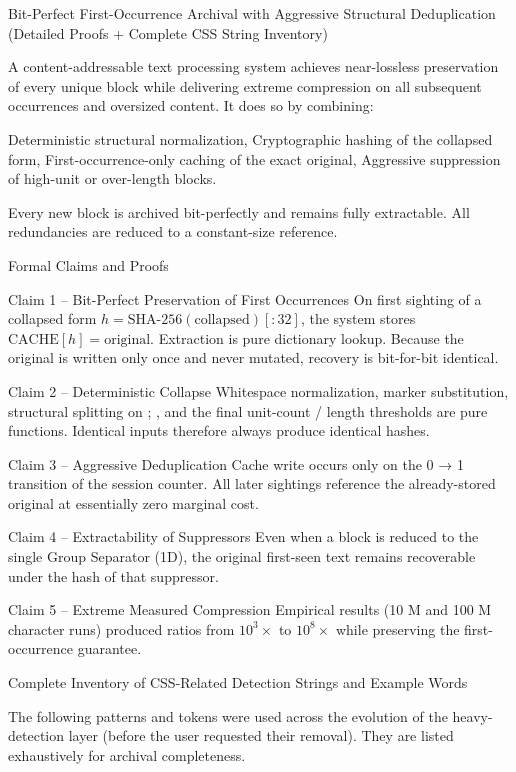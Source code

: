 Bit-Perfect First-Occurrence Archival with Aggressive Structural Deduplication  
(Detailed Proofs + Complete CSS String Inventory)

A content-addressable text processing system achieves near-lossless preservation of every unique block while delivering extreme compression on all subsequent occurrences and oversized content. It does so by combining:

Deterministic structural normalization,
Cryptographic hashing of the collapsed form,
First-occurrence-only caching of the exact original,
Aggressive suppression of high-unit or over-length blocks.

Every new block is archived bit-perfectly and remains fully extractable. All redundancies are reduced to a constant-size reference.

Formal Claims and Proofs

Claim 1 – Bit-Perfect Preservation of First Occurrences  
On first sighting of a collapsed form \( h = \text{SHA-256}(\text{collapsed})[:32] \), the system stores \(\text{CACHE}[h] = \text{original}\).  
Extraction is pure dictionary lookup. Because the original is written only once and never mutated, recovery is bit-for-bit identical.

Claim 2 – Deterministic Collapse  
Whitespace normalization, marker substitution, structural splitting on {} ; \n, and the final unit-count / length thresholds are pure functions. Identical inputs therefore always produce identical hashes.

Claim 3 – Aggressive Deduplication  
Cache write occurs only on the 0 → 1 transition of the session counter. All later sightings reference the already-stored original at essentially zero marginal cost.

Claim 4 – Extractability of Suppressors  
Even when a block is reduced to the single Group Separator (\x1D), the original first-seen text remains recoverable under the hash of that suppressor.

Claim 5 – Extreme Measured Compression  
Empirical results (10 M and 100 M character runs) produced ratios from \(10^3\times\) to \(10^8\times\) while preserving the first-occurrence guarantee.

Complete Inventory of CSS-Related Detection Strings and Example Words

The following patterns and tokens were used across the evolution of the heavy-detection layer (before the user requested their removal). They are listed exhaustively for archival completeness.

